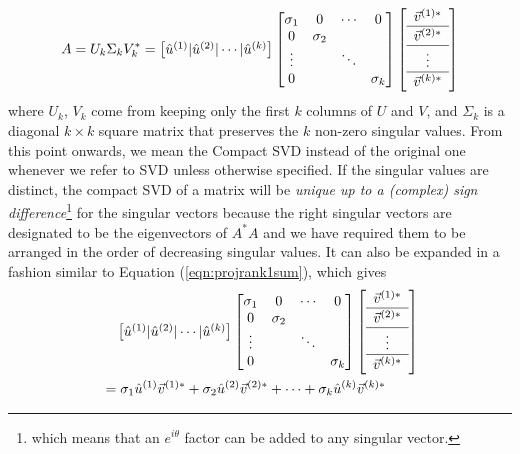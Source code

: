 \begin{align}
A = U_k\Sigma_k V_k^* = \begin{bmatrix}
\hat{u}^{(1)} | \hat{u}^{(2)} | \cdots | \hat{u}^{(k)}
\end{bmatrix}
\begin{bmatrix}
\sigma_1 & 0 & \cdots & 0 \\
0 & \sigma_2 & & \\
\vdots & & \ddots & \\
0 & & & \sigma_k
\end{bmatrix}
\left[\begin{array}{c} 
\vec{v}^{(1)*} \\
\hline
\vec{v}^{(2)*} \Tstrut \\
\hline
\vdots \\
\hline 
\vec{v}^{(k)*} \Tstrut 
\end{array}\right] 
\end{align}
where $U_k$, $V_k$ come from keeping only the first $k$ columns of $U$ and $V$, and $\Sigma_k$ is a diagonal $k \times k$ square matrix that preserves the $k$ non-zero singular values. From this point onwards, we mean the Compact SVD instead of the original one whenever we refer to SVD unless otherwise specified. If the singular values are distinct, the compact SVD of a matrix will be \textit{unique up to a (complex) sign difference}\footnote{which means that an $e^{i\theta}$ factor can be added to any singular vector.} for the singular vectors because the right singular vectors are designated to be the eigenvectors of $A^*A$ and we have required them to be arranged in the order of decreasing singular values. It can also be expanded in a fashion similar to Equation (\ref{eqn:projrank1sum}), which gives
\begin{align}
& \quad \begin{bmatrix}
\hat{u}^{(1)} | \hat{u}^{(2)} | \cdots | \hat{u}^{(k)}
\end{bmatrix}
\begin{bmatrix}
\sigma_1 & 0 & \cdots & 0 \\
0 & \sigma_2 & & \\
\vdots & & \ddots & \\
0 & & & \sigma_k
\end{bmatrix}
\left[\begin{array}{c} 
\vec{v}^{(1)*} \\
\hline
\vec{v}^{(2)*} \Tstrut \\
\hline
\vdots \\
\hline 
\vec{v}^{(k)*} \Tstrut 
\end{array}\right] \nonumber \\
&= \sigma_1\hat{u}^{(1)}\vec{v}^{(1)*} + \sigma_2\hat{u}^{(2)}\vec{v}^{(2)*} + \cdots + \sigma_k\hat{u}^{(k)}\vec{v}^{(k)*} 
\end{align}

